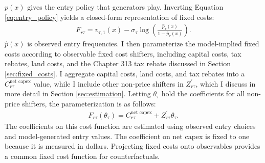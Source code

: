 \documentclass[12pt]{article}
\begin{document}

$p(x)$ gives the entry policy that generators play. Inverting Equation \eqref{eq:entry_policy} yields a closed-form representation of fixed costs:
\begin{align}
    \label{eq:fixed_cost_inversion}
    F_{r\tau} = v_{\tau,1}(x) - \sigma_\tau \log(\frac{\hat{p}_\tau(x)}{1-\hat{p}_\tau(x)}).
\end{align}
$\hat{p}(x)$ is observed entry frequencies. I then parameterize the model-implied fixed costs according to observable fixed cost shifters, including capital costs, tax rebates, land costs, and the Chapter 313 tax rebate discussed in Section \ref{sec:fixed_costs}. I aggregate capital costs, land costs, and tax rebates into a $C^{\text{net capex}}_{r\tau}$ value, while I include other non-price shifters in $Z^\prime_{r\tau}$, which I discuss in more detail in Section \ref{sec:estimation}. Letting $\theta_\tau$ hold the coefficients for all non-price shifters, the parameterization is as follows:
\begin{align}
    \label{eq:fixed_cost_representation}
    F_{r\tau}(\theta_\tau) = C^{\text{net capex}}_{r\tau} + Z^\prime_{r\tau}\theta_\tau.
\end{align}
The coefficients on this cost function are estimated using observed entry choices and model-generated entry values. The coefficient on net capex is fixed to one because it is measured in dollars. Projecting fixed costs onto observables provides a common fixed cost function for counterfactuals.

\end{document}
